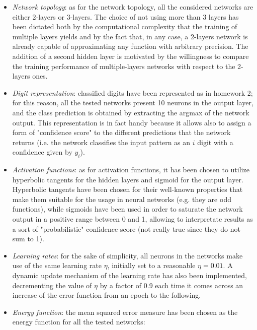 \documentclass[letterpaper,headings=standardclasses]{scrartcl}
\begin{document}
\begin{itemize}
    
    \item \emph{Network topology}: as for the network topology, all the considered networks are either 2-layers or 3-layers. The choice of not using more than 3 layers has been dictated both by the computational complexity that the training of multiple layers yields and by the fact that, in any case, a 2-layers network is already capable of approximating any function with arbitrary precision. The addition of a second hidden layer is motivated by the willingness to compare the training performance of multiple-layers networks with respect to the 2-layers ones.
    
    \item \emph{Digit representation}: classified digits have been represented as in homework 2; for this reason, all the tested networks present 10 neurons in the output layer, and the class prediction is obtained by extracting the argmax of the network output. This representation is in fact handy because it allows also to assign a form of "confidence score" to the different predictions that the network returns (i.e. the network classifies the input pattern as an $i$ digit with a confidence given by $y_i$).
    
    \item \emph{Activation functions}: as for activation functions, it has been chosen to utilize hyperbolic tangents for the hidden layers and sigmoid for the output layer. Hyperbolic tangents have been chosen for their well-known properties that make them suitable for the usage in neural networks (e.g. they are odd functions), while sigmoids have been used in order to saturate the network output in a positive range between 0 and 1, allowing to interpretate results as a sort of "probabilistic" confidence score (not really true since they do not sum to 1).
    
    \item \emph{Learning rates}: for the sake of simplicity, all neurons in the networks make use of the same learning rate $\eta$, initially set to a reasonable $\eta = 0.01$. A dynamic update mechanism of the learning rate has also been implemented, decrementing the value of $\eta$ by a factor of 0.9 each time it comes across an increase of the error function from an epoch to the following.
    
    \item \emph{Energy function}: the mean squared error measure has been chosen as the energy function for all the tested networks:
    

\end{itemize}
\end{document}
